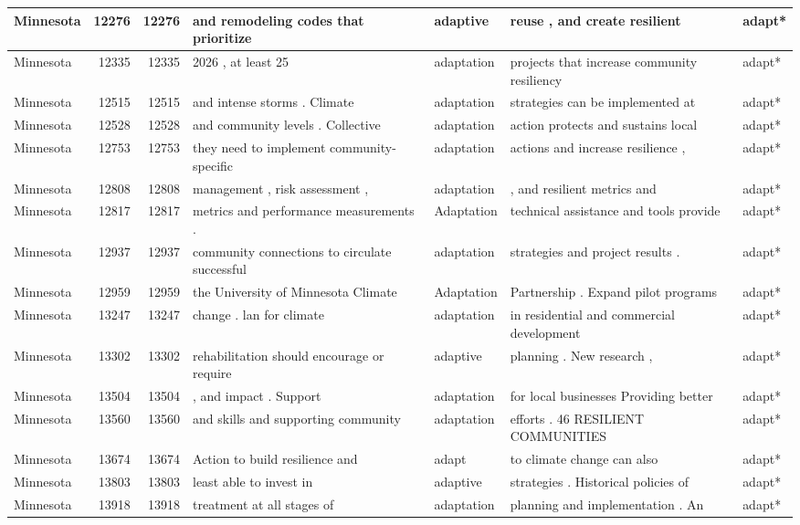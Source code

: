 \documentclass[
]{article}
\begin{document}
\begin{table}
\begin{tabular}[t]{l|r|r|l|l|l|l}
\hline
Minnesota & 12276 & 12276 & and remodeling codes that prioritize & adaptive & reuse , and create resilient & adapt*\\
\hline
Minnesota & 12335 & 12335 & 2026 , at least 25 & adaptation & projects that increase community resiliency & adapt*\\
\hline
Minnesota & 12515 & 12515 & and intense storms . Climate & adaptation & strategies can be implemented at & adapt*\\
\hline
Minnesota & 12528 & 12528 & and community levels . Collective & adaptation & action protects and sustains local & adapt*\\
\hline
Minnesota & 12753 & 12753 & they need to implement community-specific & adaptation & actions and increase resilience , & adapt*\\
\hline
Minnesota & 12808 & 12808 & management , risk assessment , & adaptation & , and resilient metrics and & adapt*\\
\hline
Minnesota & 12817 & 12817 & metrics and performance measurements . & Adaptation & technical assistance and tools provide & adapt*\\
\hline
Minnesota & 12937 & 12937 & community connections to circulate successful & adaptation & strategies and project results . & adapt*\\
\hline
Minnesota & 12959 & 12959 & the University of Minnesota Climate & Adaptation & Partnership . Expand pilot programs & adapt*\\
\hline
Minnesota & 13247 & 13247 & change . lan for climate & adaptation & in residential and commercial development & adapt*\\
\hline
Minnesota & 13302 & 13302 & rehabilitation should encourage or require & adaptive & planning . New research , & adapt*\\
\hline
Minnesota & 13504 & 13504 & , and impact . Support & adaptation & for local businesses Providing better & adapt*\\
\hline
Minnesota & 13560 & 13560 & and skills and supporting community & adaptation & efforts . 46 RESILIENT COMMUNITIES & adapt*\\
\hline
Minnesota & 13674 & 13674 & Action to build resilience and & adapt & to climate change can also & adapt*\\
\hline
Minnesota & 13803 & 13803 & least able to invest in & adaptive & strategies . Historical policies of & adapt*\\
\hline
Minnesota & 13918 & 13918 & treatment at all stages of & adaptation & planning and implementation . An & adapt*\\

\end{tabular}
\end{table}
\end{document}
